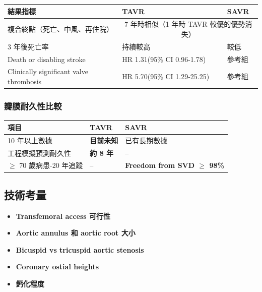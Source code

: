 \documentclass[12pt,a4paper]{article}
\begin{document}
\begin{longtable}{p{5cm}p{4.5cm}p{4.5cm}}
\toprule
\textbf{結果指標} & \textbf{TAVR} & \textbf{SAVR} \\
\midrule
\endfirsthead
複合終點\newline（死亡、中風、再住院） & \multicolumn{2}{c}{7 年時相似（1 年時 TAVR 較優的優勢消失）} \\
\midrule
3 年後死亡率 & \textcolor{emergency_red}{持續較高} & 較低 \\
\midrule
Death or disabling stroke & HR 1.31\newline (95\% CI 0.96-1.78) & 參考組 \\
\midrule
Clinically significant valve thrombosis & \textcolor{emergency_red}{HR 5.70}\newline (95\% CI 1.29-25.25) & 參考組 \\
\bottomrule
\end{longtable}


\subsubsection{瓣膜耐久性比較}

\begin{longtable}{p{4cm}p{5cm}p{5cm}}
\toprule
\textbf{項目} & \textbf{TAVR} & \textbf{SAVR} \\
\midrule
\endfirsthead
10 年以上數據 & \textcolor{emergency_red}{\textbf{目前未知}} & 已有長期數據 \\
\midrule
工程模擬預測耐久性 & \textcolor{emergency_red}{\textbf{約 8 年}} & -- \\
\midrule
$\geq$ 70 歲病患\newline 15-20 年追蹤 & -- & \textcolor{emergency_blue}{\textbf{Freedom from SVD $\geq$ 98\%}} \\
\bottomrule
\end{longtable}

\subsection{技術考量}

\begin{itemize}[leftmargin=*]
    \item \textbf{Transfemoral access 可行性}
    \item \textbf{Aortic annulus 和 aortic root 大小}
    \item \textbf{Bicuspid vs tricuspid aortic stenosis}
    \item \textbf{Coronary ostial heights}
    \item \textbf{鈣化程度}
\end{itemize}
\end{document}
